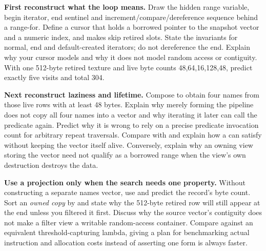 \textbf{First reconstruct what the loop means.} Draw the hidden range variable, begin iterator, end sentinel and increment/compare/dereference sequence behind a range-for. Define a cursor that holds a borrowed pointer to the snapshot vector and a numeric index, and makes  skip retired slots. State the invariants for normal, end and default-created iterators; do not dereference the end. Explain why your cursor models  and why it does not model random access or contiguity. With one 512-byte retired texture and live byte counts 48,64,16,128,48, predict exactly five visits and total 304.

\textbf{Next reconstruct laziness and lifetime.} Compose  to obtain four names from those live rows with at least 48 bytes. Explain why merely forming the pipeline does not copy all four names into a vector and why iterating it later can call the predicate again. Predict why it is wrong to rely on a precise predicate invocation count for arbitrary repeat traversals. Compare  with  and explain how a  can satisfy  without keeping the vector itself alive. Conversely, explain why an owning view storing the vector need not qualify as a borrowed range when the view's own destruction destroys the data.

\textbf{Use a projection only when the search needs one property.} Without constructing a separate names vector, use  and predict the record's byte count. Sort an \emph{owned copy} by  and state why the 512-byte retired row will still appear at the end unless you filtered it first. Discuss why the source vector's contiguity does not make a filter view a writable random-access container. Compare  against an equivalent threshold-capturing lambda, giving a plan for benchmarking actual instruction and allocation costs instead of asserting one form is always faster.

